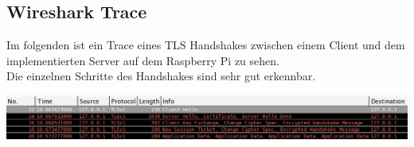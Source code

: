 \subsection{Wireshark Trace}
Im folgenden ist ein Trace eines TLS Handshakes zwischen einem Client und dem implementierten Server auf dem Raspberry Pi zu sehen. \\
Die einzelnen Schritte des Handshakes sind sehr gut erkennbar.\\
\begin{minipage}{\linewidth}
            \centering
            \includegraphics[width=\textwidth]{./data/wireshark.png}
        \end{minipage}